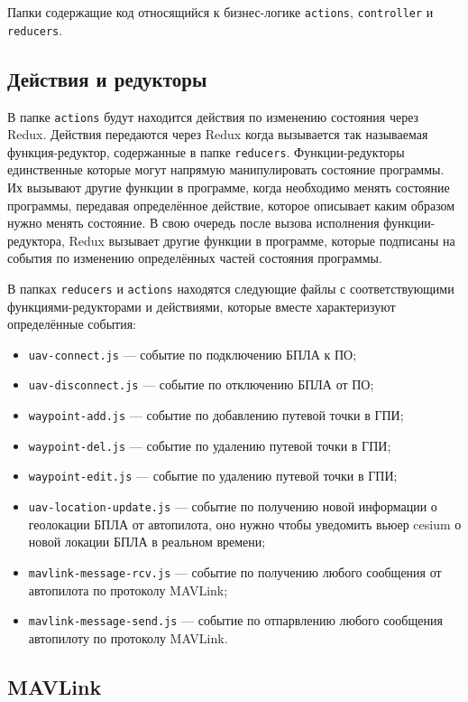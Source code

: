 \documentclass[specification,annotation]{itmo-student-thesis}
\begin{document}
Папки содержащие код относящийся к бизнес-логике \verb|actions|,
\verb|controller| и \verb|reducers|.

\subsection{Действия и редукторы}

В папке \verb|actions| будут находится действия по изменению состояния через
Redux. Действия передаются через Redux когда вызывается так называемая
функция-редуктор, содержанные в папке \verb|reducers|. Функции-редукторы
единственные которые могут напрямую манипулировать состояние программы. Их
вызывают другие функции в программе, когда необходимо менять состояние
программы, передавая определённое действие, которое описывает каким образом
нужно менять состояние. В свою очередь после вызова исполнения
функции-редуктора, Redux вызывает другие функции в программе, которые подписаны
на события по изменению определённых частей состояния программы.

В папках \verb|reducers| и \verb|actions| находятся следующие файлы с
соответствующими функциями-редукторами и действиями, которые вместе
характеризуют определённые события:

\begin{itemize}
  \item \verb|uav-connect.js| --- событие по подключению БПЛА к ПО;
  \item \verb|uav-disconnect.js| --- событие по отключению БПЛА от ПО;
  \item \verb|waypoint-add.js| --- событие по добавлению путевой точки в ГПИ;
  \item \verb|waypoint-del.js| --- событие по удалению путевой точки в ГПИ;
  \item \verb|waypoint-edit.js| --- событие по удалению путевой точки в ГПИ;
  \item \verb|uav-location-update.js| --- событие по получению новой информации
    о геолокации БПЛА от автопилота, оно нужно чтобы уведомить вьюер cesium о
    новой локации БПЛА в реальном времени;
  \item \verb|mavlink-message-rcv.js| --- событие по получению любого сообщения
    от автопилота по протоколу MAVLink;
  \item \verb|mavlink-message-send.js| --- событие по отпарвлению любого
    сообщения автопилоту по протоколу MAVLink.
\end{itemize}

\subsection{MAVLink}
\end{document}
